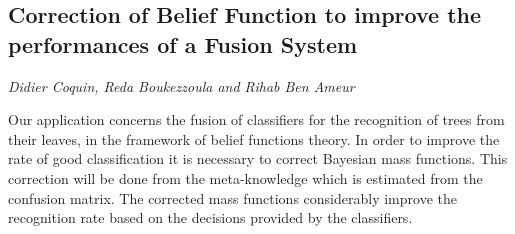 \documentclass[../booklet.tex]{subfiles}
\begin{document}
\subsection[Correction of Belief Function to improve the performances of a Fusion System. {\it Didier Coquin, Reda Boukezzoula and Rihab Ben Ameur}]{Correction of Belief Function to improve the performances of a Fusion System}
  

\begin{center}
  {\it Didier Coquin, Reda Boukezzoula and Rihab Ben Ameur}
\end{center}

\vskip 0.8cm


Our application concerns the fusion of classifiers for the recognition of trees from their leaves, in the framework of belief functions theory. In order to improve the rate of good classification it is necessary to correct Bayesian mass functions. This correction will be done from the meta-knowledge which is estimated from the confusion matrix. The corrected mass functions considerably improve the recognition rate based on the decisions provided by the classifiers.
\end{document}
